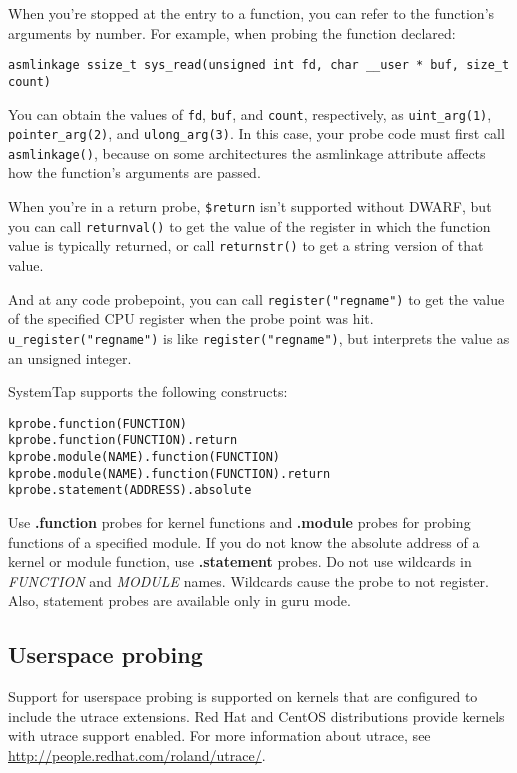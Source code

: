 \documentclass[twoside,english]{article}
\newenvironment{vindent}
{\begin{list}{}{\setlength{\listparindent}{6pt}}
\item[]}
{\end{list}}
\begin{document}
When you're stopped at the entry to a function, you can refer to the
function's arguments by number. For example, when probing the function
declared:

\begin{vindent}
\begin{verbatim}
asmlinkage ssize_t sys_read(unsigned int fd, char __user * buf, size_t
count)
\end{verbatim}
\end{vindent}

You can obtain the values of \texttt{fd}, \texttt{buf}, and
\texttt{count}, respectively, as \texttt{uint\_arg(1)},
\texttt{pointer\_arg(2)}, and \texttt{ulong\_arg(3)}. In this case, your
probe code must first call \texttt{asmlinkage()}, because on some
architectures the asmlinkage attribute affects how the function's
arguments are passed.

When you're in a return probe, \texttt{\$return} isn't supported
without DWARF, but you can call \texttt{returnval()} to get the value
of the register in which the function value is typically returned, or
call \texttt{returnstr()} to get a string version of that value.

And at any code probepoint, you can call
\texttt{{register("regname")}} to get the value of the specified CPU
register when the probe point was hit.
\texttt{u\_register("regname")} is like \texttt{register("regname")},
but interprets the value as an unsigned integer.

SystemTap supports the following constructs:
\begin{vindent}
\begin{verbatim}
kprobe.function(FUNCTION)
kprobe.function(FUNCTION).return
kprobe.module(NAME).function(FUNCTION)
kprobe.module(NAME).function(FUNCTION).return
kprobe.statement(ADDRESS).absolute
\end{verbatim}
\end{vindent}

Use \textbf{.function} probes for kernel functions and
\textbf{.module} probes for probing functions of a specified module.
If you do not know the absolute address of a kernel or module
function, use \textbf{.statement} probes. Do not use wildcards in
\textit{FUNCTION} and \textit{MODULE} names. Wildcards cause the probe
to not register. Also, statement probes are available only in guru mode.


\subsection{Userspace probing}
Support for userspace probing is supported on kernels that are
configured to include the utrace extensions.  Red Hat and CentOS
distributions provide kernels with utrace support enabled.  For more
information about utrace, see
\url{http://people.redhat.com/roland/utrace/}.
\end{document}
